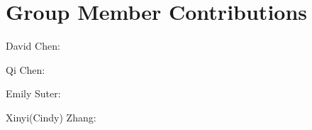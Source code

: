 \documentclass{article}
\begin{document}
\section{Group Member Contributions}\label{s4}
David Chen:

\vspace{3mm}
\noindent
Qi Chen:

\vspace{3mm}
\noindent
Emily Suter:

\vspace{3mm}
\noindent
Xinyi(Cindy) Zhang:

\nocite{selection}


\end{document}

